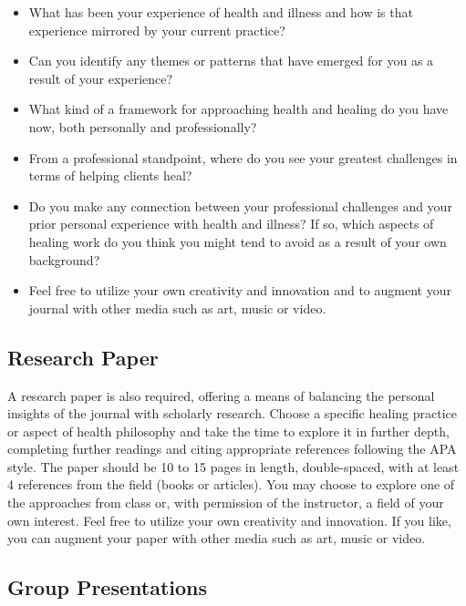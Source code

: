 \documentclass[10pt,DIV09,letterpaper,oneside,headsepline]{scrreprt}
\begin{document}
\begin{itemize}
\item What has been your experience of health and illness and how is that experience mirrored by your current practice?

\item Can you identify any themes or patterns that have emerged for you as a result of your experience?

\item What kind of a framework for approaching health and healing do you have now, both personally and professionally?

\item From a professional standpoint, where do you see your greatest challenges in terms of helping clients heal?

\item Do you make any connection between your professional challenges and your prior personal experience with health and illness? If so, which aspects of healing work do you think you might tend to avoid as a result of your own background?

\item Feel free to utilize your own creativity and innovation and to augment your journal with other media such as art, music or video.

\end{itemize}


\subsection{Research Paper}

A research paper is also required, offering a means of balancing the personal insights of the journal with scholarly research. Choose a specific healing practice or aspect of health philosophy and take the time to explore it in further depth, completing further readings and citing appropriate references following the APA style. The paper should be 10 to 15 pages in length, double-spaced, with at least 4 references from the field (books or articles). You may choose to explore one of the approaches from class or, with permission of the instructor, a field of your own interest. Feel free to utilize your own creativity and innovation. If you like, you can augment your paper with other media such as art, music or video.

\subsection{Group Presentations}
\end{document}
